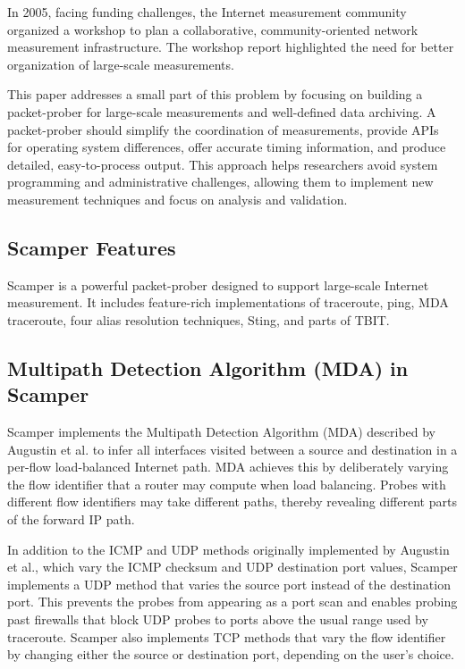 \documentclass[12pt]{cwru_thesis}
\begin{document}
In 2005, facing funding challenges, the Internet measurement community organized a workshop to plan a collaborative, community-oriented network measurement infrastructure. The workshop report highlighted the need for better organization of large-scale measurements.

This paper addresses a small part of this problem by focusing on building a packet-prober for large-scale measurements and well-defined data archiving. A packet-prober should simplify the coordination of measurements, provide APIs for operating system differences, offer accurate timing information, and produce detailed, easy-to-process output. This approach helps researchers avoid system programming and administrative challenges, allowing them to implement new measurement techniques and focus on analysis and validation.

\subsection{Scamper Features}

Scamper is a powerful packet-prober designed to support large-scale Internet measurement. It includes feature-rich implementations of traceroute, ping, MDA traceroute, four alias resolution techniques, Sting, and parts of TBIT.

\subsection{Multipath Detection Algorithm (MDA) in Scamper}

Scamper implements the Multipath Detection Algorithm (MDA) described by Augustin et al. to infer all interfaces visited between a source and destination in a per-flow load-balanced Internet path. MDA achieves this by deliberately varying the flow identifier that a router may compute when load balancing. Probes with different flow identifiers may take different paths, thereby revealing different parts of the forward IP path.

In addition to the ICMP and UDP methods originally implemented by Augustin et al., which vary the ICMP checksum and UDP destination port values, Scamper implements a UDP method that varies the source port instead of the destination port. This prevents the probes from appearing as a port scan and enables probing past firewalls that block UDP probes to ports above the usual range used by traceroute. Scamper also implements TCP methods that vary the flow identifier by changing either the source or destination port, depending on the user’s choice.
\end{document}

